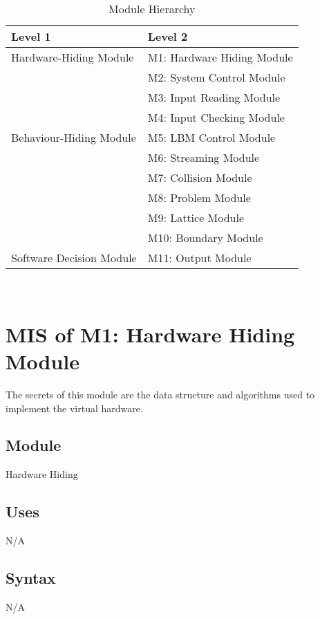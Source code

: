 \documentclass[12pt, titlepage]{article}
\begin{document}
\begin{table}[h!]
	\centering
	\begin{tabular}{p{} p{}}
		\toprule
		\textbf{Level 1} & \textbf{Level 2}\\
		\midrule
		
		{Hardware-Hiding Module}
		& M1: Hardware Hiding Module\\
		\midrule
		
		\multirow{7}{0.3\textwidth}{Behaviour-Hiding Module}
		& M2: System Control Module\\
		& M3: Input Reading Module\\
		& M4: Input Checking Module\\
		& M5: LBM Control Module\\
		& M6: Streaming Module\\
		& M7: Collision Module\\ 
		& M8: Problem Module\\
		& M9: Lattice Module\\
		& M10: Boundary Module\\
		\midrule
		
		\multirow{1}{0.3\textwidth}{Software Decision Module}
		& M11: Output Module\\
		\bottomrule
		
	\end{tabular}
	\caption{Module Hierarchy}
	\label{TblMH}
\end{table}


~\newpage

\section{MIS of M1: Hardware Hiding Module} \label{HHModule} 

The secrets of this module are the data structure and algorithms used to implement the virtual hardware.

\subsection{Module}

Hardware Hiding

\subsection{Uses}
N/A

\subsection{Syntax}
N/A
\end{document}
